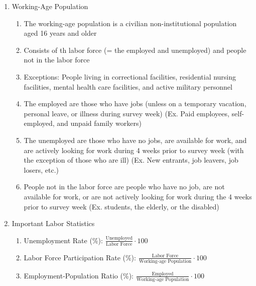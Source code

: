 \documentclass[12pt]{article}
\begin{document}
\begin{enumerate}
      \item Working-Age Population

        \begin{enumerate}

          \item The working-age population is a civilian non-institutional population aged 16 years and older

          \item Consists of th labor force (= the employed and unemployed) and people not in the labor force

          \item Exceptions: People living in correctional facilities, residential nursing facilities, mental health care facilities, and active military personnel

          \item The employed are those who have jobs (unless on a temporary vacation, personal leave, or illness during survey week) (Ex. Paid employees, self-employed, and unpaid family workers)

          \item The unemployed are those who have no jobs, are available for work, and are actively looking for work during 4 weeks prior to survey week (with the exception of those who are ill) (Ex. New entrants, job leavers, job losers, etc.)

          \item People not in the labor force are people who have no job, are not available for work, or are not actively looking for work during the 4 weeks prior to survey week (Ex. students, the elderly, or the disabled)
            
        \end{enumerate}

      \item Important Labor Statistics

        \begin{enumerate}

          \item Unemployment Rate (\%): $\frac{\text{Unemployed}}{\text{Labor Force}}\cdot100$

          \item Labor Force Participation Rate (\%): $\frac{\text{Labor Force}}{\text{Working-age Population}}\cdot100$

          \item Employment-Population Ratio (\%): $\frac{\text{Employed}}{\text{Working-age Population}}\cdot100$


\end{enumerate}
\end{enumerate}
\end{document}
